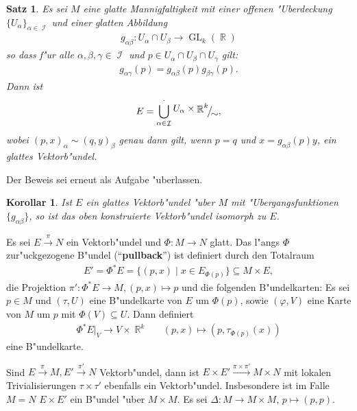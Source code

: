 \documentclass[paper=A4, twoside, chapterprefix=true, bibliography=totoc, headsepline]{scrbook}
\let\temp\phi{}
\let\phi\varphi{}
\let\varphi\temp{}
\let\temp\theta{}
\let\theta\vartheta{}
\let\vartheta\temp{}
\let\temp\epsilon{}
\let\epsilon\varepsilon{}
\let\varepsilon\temp{}
\let\temp\rho{}
\let\rho\varrho{}
\let\varrho\temp{}
\DeclareMathOperator{\R}{\mathbb{R}}
\DeclareMathOperator{\calI}{\mathcal{I}}
\DeclareMathOperator{\Gl}{GL}       %
\newcommand{\X}{\times}
\newcommand{\FakRaum}[2]{
	\raisebox{0.7ex}{\ensuremath{#1}}
	\ensuremath{\mkern-3mu}\big/\ensuremath{\mkern-3mu}
	\raisebox{-0.6ex}{\ensuremath{#2}}}
\theoremstyle{plain}
\newtheorem{Satz}[Dfn]{Satz}
\theoremstyle{nonumberplain}
\newtheorem{kor}{Korollar}
\theoremstyle{empty}
\theoremstyle{break}
\newcommand{\CmIndex}[2][]{\ifthenelse{\isempty{#1}}{\index{#2}}{\index{#1}}#2}
\newcommand{\CmMark}[2][]{\textbf{\CmIndex[#1]{#2}}}
\begin{document}
\begin{Satz}\label{satz-5-2}
  Es sei $M$ eine glatte Mannigfaltigkeit mit einer offenen "Uberdeckung $\{U_{\alpha}\}_{\alpha \in \calI}$ und einer glatten Abbildung
  \begin{align*}
    g_{\alpha\beta} \colon U_{\alpha} \cap U_{\beta} \to \Gl_k(\R)
  \end{align*}
so dass f"ur alle $\alpha,\beta,\gamma \in \calI$ und $p \in U_{\alpha} \cap U_{\beta} \cap U_{\gamma}$ gilt:
\begin{align*}
  g_{\alpha\gamma} (p) = g_{\alpha\beta}(p)g_{\beta\gamma}(p).
\end{align*}
Dann ist
	\[ E = \bigcup_{\alpha \in \calI}^{\cdot} \FakRaum{U_{\alpha} \times \R^k}{\sim}, \]
wobei $(p,x)_{\alpha} \sim (q,y)_{\beta}$ genau dann gilt, wenn $p = q$ und $x = g_{\alpha\beta}(p)y$, ein glattes Vektorb"undel.
\end{Satz}

Der Beweis sei erneut als Aufgabe "uberlassen.

\begin{kor}
  Ist $E$ ein glattes Vektorb"undel "uber $M$ mit "Ubergangsfunktionen $\{g_{\alpha\beta}\}$, so ist das oben konstruierte Vektorb"undel isomorph zu $E$.
\end{kor}

Es sei $E \xrightarrow{\pi} N$ ein Vektorb"undel und $\Phi \colon M \to N$ glatt.
Das l"angs $\Phi$ zur"uckgezogene B"undel ("`\CmMark{pullback}"') ist definiert durch den Totalraum
\begin{align*}
  E' = \Phi^{\ast}E = \{(p,x) \mid x \in E_{\Phi(p)}\} \subseteq M \times E,
\end{align*}
die Projektion $\pi' \colon \Phi^{\ast}E \to M, (p,x) \mapsto p$ und die folgenden B"undelkarten:
Es sei $p \in M$ und $(\tau, U)$ eine B"undelkarte von $E$ um $\Phi(p)$, sowie $(\phi,V)$ eine Karte von $M$ um $p$ mit $\Phi(V) \subseteq U$.
Dann definiert 
\begin{align*}
  \Phi^{\ast}E|_V \to V \times \R^k && (p,x) \mapsto \left(p, \tau_{\Phi(p)}(x)\right)
\end{align*}
eine B"undelkarte.

Sind $E \xrightarrow{\pi} M, E' \xrightarrow{\pi'} N$ Vektorb"undel, dann ist $E \times E' \xrightarrow{\pi \times \pi'} M \times N$ mit lokalen Trivialisierungen $\tau \times \tau'$ ebenfalls ein Vektorb"undel.
Insbesondere ist im Falle $M = N$ $E \times E'$ ein B"undel "uber $M \X M$.
Es sei $\Delta \colon M \to M \times M$, $p \mapsto (p,p)$.
\end{document}
